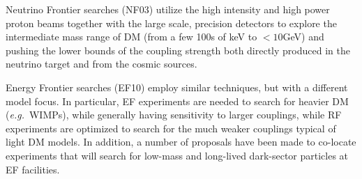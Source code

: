 \documentclass[nofootinbib]{article}
\begin{document}
Neutrino Frontier searches (NF03) utilize the high intensity and high power proton beams together with the large scale, precision detectors to explore the intermediate mass range of DM (from a few 100s of keV to $<10$GeV) and pushing the lower bounds of the coupling strength both directly produced in the neutrino target and from the cosmic sources.  

Energy Frontier searches (EF10) employ similar techniques, but with a different model focus. In particular, EF experiments are needed to search for heavier DM ({\em e.g.}\ WIMPs), while generally having sensitivity to larger couplings, while RF experiments are optimized to search for the much weaker couplings typical of light DM models.   
In addition, a number of proposals have been made to co-locate experiments that will search for low-mass and long-lived dark-sector particles at EF facilities. 

%
%
\end{document}
